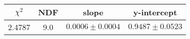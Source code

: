 \begin{tabular}{|c|c|c|c|}

\hline
$\chi^{2}$ & NDF & slope & y-intercept  \\
\hline
2.4787 & 9.0 & $0.0006\pm0.0004$ & $0.9487\pm0.0523$ \\
\hline

\end{tabular}